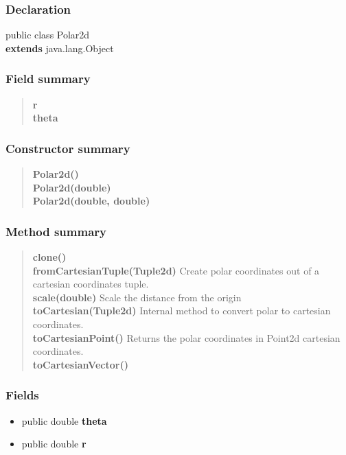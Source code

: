 {{\subsubsection{Declaration}{
\small public class Polar2d
\\ {\bf extends} java.lang.Object
}
\subsubsection{Field summary}{
\begin{verse}
{\bf r} \\
{\bf theta} \\
\end{verse}
}
\subsubsection{Constructor summary}{
\begin{verse}
{\bf Polar2d()} \\
{\bf Polar2d(double\lbrack \rbrack )} \\
{\bf Polar2d(double, double)} \\
\end{verse}
}
\subsubsection{Method summary}{
\begin{verse}
{\bf clone()} \\
{\bf fromCartesianTuple(Tuple2d)} Create polar coordinates out of a cartesian coordinates tuple.\\
{\bf scale(double)} Scale the distance from the origin\\
{\bf toCartesian(Tuple2d)} Internal method to convert polar to cartesian coordinates.\\
{\bf toCartesianPoint()} Returns the polar coordinates in Point2d cartesian coordinates.\\
{\bf toCartesianVector()} \\
\end{verse}
}
\subsubsection{Fields}{
\begin{itemize}
\item{
\label{amber.common.Polar2d.theta}public double {\bf theta}}
\item{
\label{amber.common.Polar2d.r}public double {\bf r}}
\end{itemize}
}
}}
